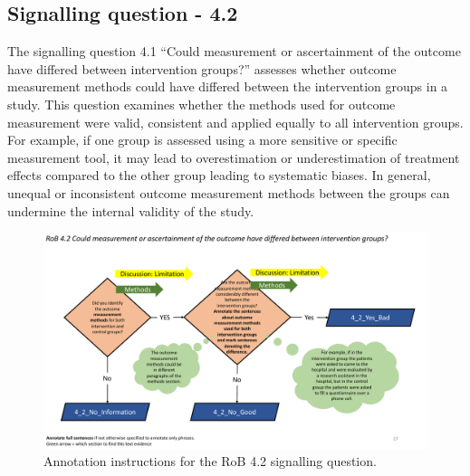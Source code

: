 \documentclass[sn-mathphys,Numbered]{sn-jnl}%
\begin{document}
\subsection*{Signalling question - 4.2 }
%
The signalling question 4.1 ``Could measurement or ascertainment of the outcome have differed between intervention groups?'' assesses whether outcome measurement methods could have differed between the intervention groups in a study.
This question examines whether the methods used for outcome measurement were valid, consistent and applied equally to all intervention groups.
For example, if one group is assessed using a more sensitive or specific measurement tool, it may lead to overestimation or underestimation of treatment effects compared to the other group leading to systematic biases.
In general, unequal or inconsistent outcome measurement methods between the groups can undermine the internal validity of the study.

%
%
%
\begin{figure}[hbt]
    \centering
    \includegraphics[width=\textwidth]{figures/4_2.pdf}
    \caption{Annotation instructions for the RoB 4.2 signalling question.}
    \label{fig:4_2}
\end{figure}
%
%
%
\end{document}

